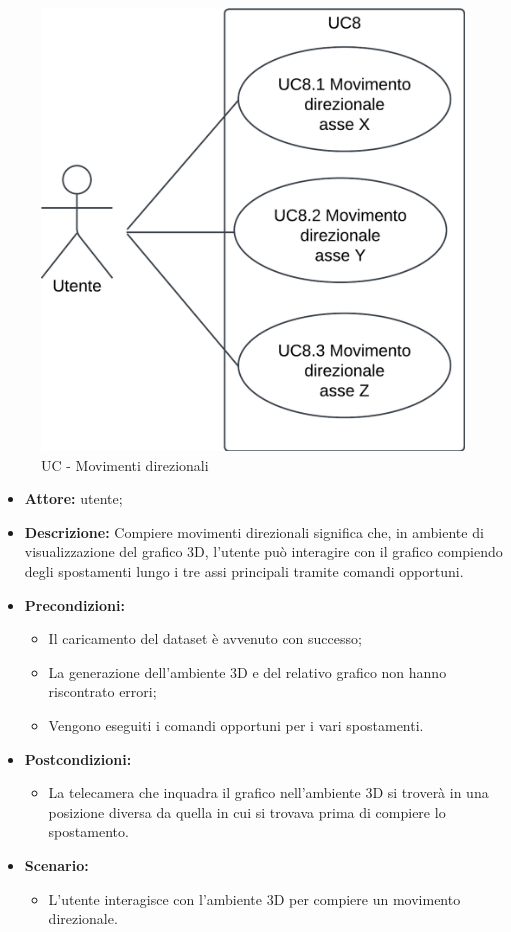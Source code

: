 \begin{figure}[h!]\centering
    \includegraphics[scale=0.7]{template/images/UC8.png}
    \caption{UC - Movimenti direzionali}
\end{figure}
\begin{itemize}    
    \item \textbf{Attore:} utente;
    \item \textbf{Descrizione:} Compiere movimenti direzionali significa che, in ambiente di visualizzazione del grafico 3D, l'utente può interagire con il grafico compiendo degli spostamenti lungo i tre assi principali tramite comandi opportuni.
    \item \textbf{Precondizioni:}    
        \begin{itemize}
            \item Il caricamento del dataset è avvenuto con successo;
            \item La generazione dell'ambiente 3D e del relativo grafico non hanno riscontrato errori;
            \item Vengono eseguiti i comandi opportuni per i vari spostamenti.
        \end{itemize}    
    \item \textbf{Postcondizioni:}
        \begin{itemize}
            \item La telecamera che inquadra il grafico nell'ambiente 3D si troverà in una posizione diversa da quella in cui si trovava prima di compiere lo spostamento.
        \end{itemize}    
    \item \textbf{Scenario:} 
        \begin{itemize}
            \item L'utente interagisce con l'ambiente 3D per compiere un movimento direzionale.
        \end{itemize}
\end{itemize}
